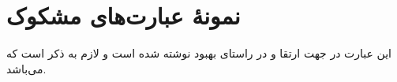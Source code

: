 \section{نمونهٔ عبارت‌های مشکوک}
این عبارت در جهت ارتقا و در راستای بهبود نوشته شده است و لازم به ذکر است که می‌باشد.
